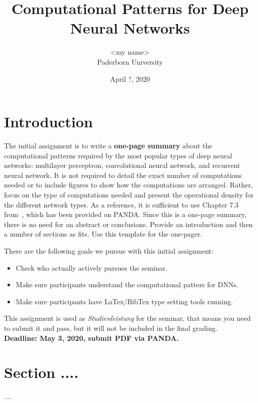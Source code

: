 \documentclass[10pt,twocolumn]{article}
\newcommand{\participant}{<my name>}
\newcommand{\affiliation}{Paderborn University}
\newcommand{\topic}{Computational Patterns for Deep Neural Networks}
\newcommand{\submissiondate}{April ?, 2020}
\begin{document}
\title{\topic}
\author{\Large{\participant}\\ \affiliation \\ {\small \emailaddress}}
\date{\submissiondate}
\maketitle
\thispagestyle{empty}




\section{Introduction}
\label{sec:introduction}

\color{blue}
The initial assignment is to write a {\bf one-page summary} about the computational patterns required by the most popular types of deep neural networks: multilayer perceptron, convolutional neural network, and recurrent neural network. It is not required to detail the exact number of computations needed or to include figures to show how the computations are arranged. Rather, focus on the type of computations needed and present the operational density for the different network types. As a reference, it is sufficient to use Chapter 7.3 from~\cite{Hennessy_Patterson_2017}, which has been provided on PANDA. Since this is a one-page summary, there is no need for an abstract or conclusions. Provide an introduction and then a number of sections as fits. Use this template for the one-pager. 

There are the following goals we pursue with this initial assignment:

\begin{itemize}
\item Check who actually actively pursues the seminar.
\item Make sure participants understand the computational patters for DNNs.  
\item Make sure participants have LaTex/BibTex type setting tools running.
\end{itemize}
	
\color{black}

\color{red}
This assignment is used as {\em Studienleistung} for the seminar, that means you need to submit it and pass, but it will not be included in the final grading. \\

{\bf Deadline: May 3, 2020, submit PDF via PANDA.}
\color{black}

\section{Section ....}
\label{sec:First_Section}

....






\end{document}
